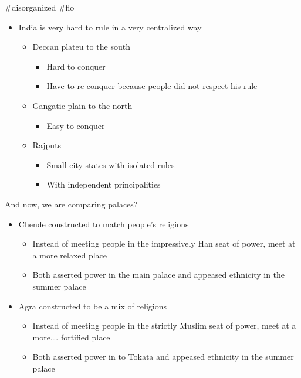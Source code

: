\documentclass[letterpaper]{article}
\begin{document}
\#disorganized \#flo

\begin{itemize}
\item India is very hard to rule in a very centralized way

\begin{itemize}
\item Deccan plateu to the south

\begin{itemize}
\item Hard to conquer
\item Have to re-conquer because people did not respect his rule
\end{itemize}

\item Gangatic plain to the north

\begin{itemize}
\item Easy to conquer
\end{itemize}

\item Rajputs

\begin{itemize}
\item Small city-states with isolated rules
\item With independent principalities
\end{itemize}
\end{itemize}
\end{itemize}

And now, we are comparing palaces?

\begin{itemize}
\item Chende constructed to match people's religions

\begin{itemize}
\item Instead of meeting people in the impressively Han seat of power,
meet at a more relaxed place
\item Both asserted power in the main palace and appeased ethnicity in the
summer palace
\end{itemize}

\item Agra constructed to be a mix of religions

\begin{itemize}
\item Instead of meeting people in the strictly Muslim seat of power, meet
at a more\ldots{}. fortified place
\item Both asserted power in to Tokata and appeased ethnicity in the
summer palace
\end{itemize}
\end{itemize}
\end{document}
